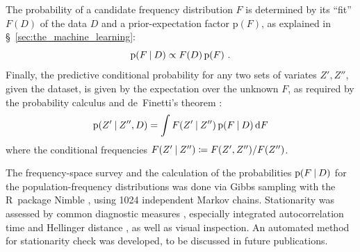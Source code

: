 \documentclass[utf8]{FrontiersinHarvard} %
\newcommand*{\wrench}{{\fontencoding{U}\fontfamily{fontawesomethree}\selectfont\symbol{114}}}
\newcommand{\mynotew}[1]{{\color{notecolour}\wrench\ #1}}
\newcommand*{\sect}{\S}%
\newcommand*{\sects}{\S\S}%
\newcommand*{\chap}{ch.}%
\newcommand*{\p}{\mathrm{p}}%
\renewcommand*{\|}[1][]{\nonscript\:#1\vert\nonscript\:\mathopen{}}
\newcommand*{\di}{\mathrm{d}}
\newcommand*{\defd}{\coloneqq}
\newcommand*{\ljm}{Ledley-Jaynes machine}
\begin{document}
The probability of a candidate frequency distribution $F$ is determined by its \enquote{fit} $F(D)$ of the data $D$ and a prior-expectation factor $\p(F)$, as explained in \sect~\ref{sec:the_machine_learning}:
\begin{equation*}
  \p(F\| D) \propto F(D)\, \p(F) \ .
\end{equation*}
Finally, the predictive conditional probability for any two sets of variates $Z',Z''$, given the dataset, is given by the expectation over the unknown $F$, as required by the probability calculus and de~Finetti's theorem \citep[\sect~4.6]{bernardoetal1994_r2000}:
\begin{equation*}
  \p(Z' \| Z'', D) = \int F(Z' \| Z'')\, \p(F\|D)\, \di F
\end{equation*}
where the conditional frequencies $F(Z'\|Z'') \defd F(Z',Z'')/F(Z'')$.


The frequency-space survey and the calculation of the probabilities $\p(F\|D)$ for the population-frequency distributions was done via Gibbs sampling \citetext{\citealp[\chap~4]{neal1993}; \citealp[\sect~29.5]{mackay1995_r2005}; \citealp{casellaetal1992}} with the R~package Nimble \citep{nimble2016_r2021}, using 1024 independent Markov chains. Stationarity was assessed by common diagnostic measures \citep{gilksetal1998}, especially integrated autocorrelation time \citep{christenetal2010} and Hellinger distance \citep{booneetal2014}, as well as visual inspection. An automated method for stationarity check was developed, to be discussed in future publications.



\end{document}
